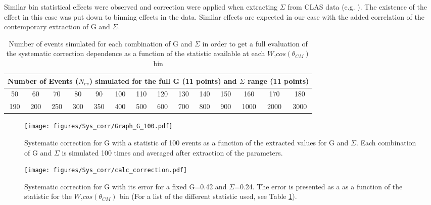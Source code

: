 Similar bin statistical effects were observed and correction were applied when extracting $\Sigma$ from CLAS data (e.g. \cite{Zacha_2017}). The existence of the effect in this case was put down to binning effects in the data. Similar effects are expected in our case with the added correlation of the contemporary extraction of G and $\Sigma$.
\begin{table}
  \begin{center}
    \begin{tabular}{ ||c|c|c|c|c|c|c|c|c|c|c|c|c|c||}
      \hline
      \multicolumn{14}{|c|}{Number of Events ($N_{ev}$) simulated for the full G (11 points) and $\Sigma$ range (11 points)  } \\
      \hline
      \hline
      50&60&70&80&90&100&110&120&130&140&150&160&170&180\\
      \hline
      190&200&250&300&350&400&500&600&700&800&900&1000&2000&3000 \\
      \hline
    \end{tabular}
  \end{center}
  \caption{Number of events simulated for each combination of G and $\Sigma$ in order to get a full evaluation of the systematic correction dependence as a function of the statistic available at each $W$,$cos(\theta_{CM})$ bin}
  \label{table:sim_nevents}
\end{table}


\begin{figure}[H]
  \begin{center}
    \texttt{[image: figures/Sys\_corr/Graph\_G\_100.pdf]} \\
    \caption{Systematic correction for G with a statistic of 100 events as a function of the extracted values for G and $\Sigma$. Each combination of G and $\Sigma$ is simulated 100 times and averaged after extraction of the parameters. }
    \label{fig:sys_correction_100}
  \end{center}
\end{figure}
\begin{figure}[H]
  \begin{center}
    \texttt{[image: figures/Sys\_corr/calc\_correction.pdf]} \\
    \caption{Systematic correction for G with its error for a fixed G=0.42 and $\Sigma$=0.24. The error is presented as a  as a function of the statistic for the $W$,$cos(\theta_{CM})$ bin (For a list of the different statistic used, see Table \ref{table:sim_nevents}).  }
    \label{fig:calc_sys_correction}
  \end{center}
\end{figure}

